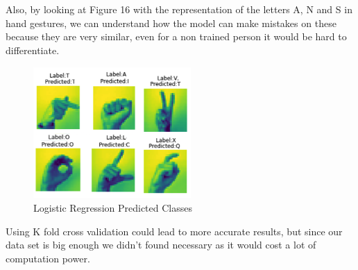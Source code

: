\documentclass[conference]{IEEEtran}
\begin{document}
Also, by looking at Figure 16 with the representation of the letters A, N and S in hand gestures, we can understand how the model can make mistakes on these because they are very similar, even for a non trained person it would be hard to differentiate.

\begin{figure}[htbp]
    \centerline{\includegraphics[width=6cm,height=5cm]{img/logistic_prediction_custom_data.png}}
    \caption{Logistic Regression Predicted Classes}
    \label{fig:logistic_predict_custom}
\end{figure}

Using K fold cross validation could lead to more accurate results, but since our data set is big enough we didn't found necessary as it would cost a lot of computation power.\cite{cross-val}
\end{document}

